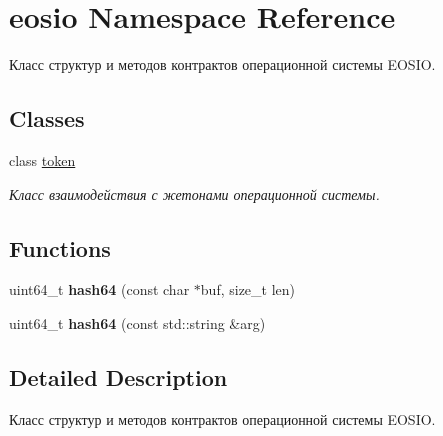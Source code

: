\hypertarget{namespaceeosio}{}\section{eosio Namespace Reference}
\label{namespaceeosio}


Класс структур и методов контрактов операционной системы E\+O\+S\+IO.  


\subsection*{Classes}
\begin{DoxyCompactItemize}
\item 
class \mbox{\hyperlink{classeosio_1_1token}{token}}
\begin{DoxyCompactList}\small\item\em Класс взаимодействия с жетонами операционной системы. \end{DoxyCompactList}\end{DoxyCompactItemize}
\subsection*{Functions}
\begin{DoxyCompactItemize}
\item 
\mbox{\label{namespaceeosio_aa41eac4d6e41ce4de8baebb043f50369}} 
uint64\+\_\+t {\bfseries hash64} (const char $\ast$buf, size\+\_\+t len)
\item 
\mbox{\label{namespaceeosio_a5e12c75cad114fc2bbee22d104959db1}} 
uint64\+\_\+t {\bfseries hash64} (const std\+::string \&arg)
\end{DoxyCompactItemize}


\subsection{Detailed Description}
Класс структур и методов контрактов операционной системы E\+O\+S\+IO. 